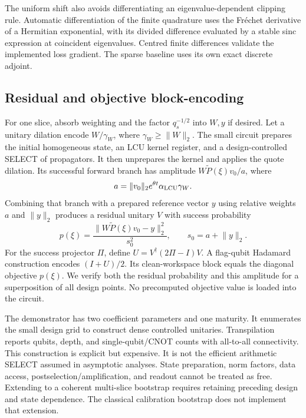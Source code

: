 \documentclass[10pt]{article}
\newcommand{\norm}[1]{\lVert #1\rVert}
\newcommand{\lchsshift}{\theta}
\begin{document}
The uniform shift also avoids differentiating an eigenvalue-dependent clipping rule. Automatic differentiation of the finite quadrature uses the Fr\'echet derivative of a Hermitian exponential, with its divided difference evaluated by a stable sinc expression at coincident eigenvalues. Centred finite differences validate the implemented loss gradient. The sparse baseline uses its own exact discrete adjoint.

\subsection{Residual and objective block-encoding}
For one slice, absorb weighting and the factor $q_s^{-1/2}$ into $W,y$ if desired. Let a unitary dilation encode $W/\gamma_W$, where $\gamma_W\geq\norm W_2$. The small circuit prepares the initial homogeneous state, an LCU kernel register, and a design-controlled SELECT of propagators. It then unprepares the kernel and applies the quote dilation. Its successful forward branch has amplitude $W\tilde P(\xi)v_0/a$, where
\begin{equation}
 a=\norm{v_0}_2e^{\lchsshift t}\alpha_{\rm LCU}\gamma_W.
\end{equation}
Combining that branch with a prepared reference vector $y$ using relative weights $a$ and $\norm y_2$ produces a residual unitary $V$ with success probability
\begin{equation}
 p(\xi)=\frac{\norm{W\tilde P(\xi)v_0-y}_2^2}{s_0^2},
 \qquad s_0=a+\norm y_2. \label{eq:prob}
\end{equation}
For the success projector $\Pi$, define $U=V^\dagger(2\Pi-I)V$. A flag-qubit Hadamard construction encodes $(I+U)/2$. Its clean-workspace block equals the diagonal objective $p(\xi)$. We verify both the residual probability and this amplitude for a superposition of all design points. No precomputed objective value is loaded into the circuit.

The demonstrator has two coefficient parameters and one maturity. It enumerates the small design grid to construct dense controlled unitaries. Transpilation reports qubits, depth, and single-qubit/CNOT counts with all-to-all connectivity. This construction is explicit but expensive. It is not the efficient arithmetic SELECT assumed in asymptotic analyses. State preparation, norm factors, data access, postselection/amplification, and readout cannot be treated as free. Extending to a coherent multi-slice bootstrap requires retaining preceding design and state dependence. The classical calibration bootstrap does not implement that extension.
\end{document}
